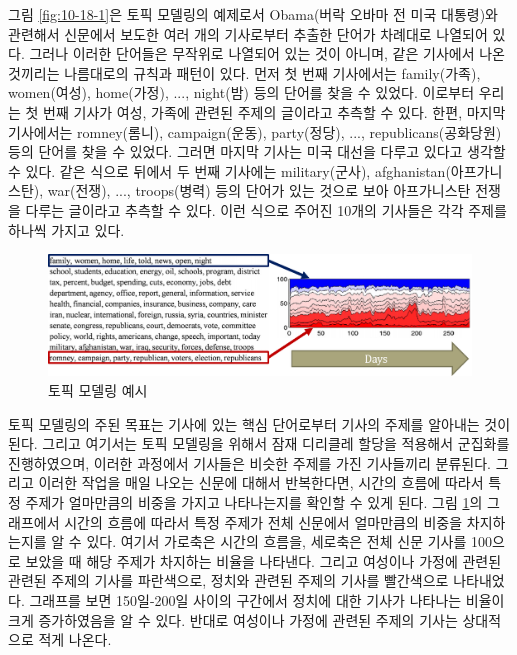 \documentclass[a4paper]{oblivoir}
\begin{document}
그림 \ref{fig:10-18-1}은 토픽 모델링의 예제로서 Obama(버락 오바마 전 미국 대통령)와 관련해서 신문에서 보도한 여러 개의 기사로부터 추출한 단어가 차례대로 나열되어 있다. 그러나 이러한 단어들은 무작위로 나열되어 있는 것이 아니며, 같은 기사에서 나온 것끼리는 나름대로의 규칙과 패턴이 있다. 먼저 첫 번째 기사에서는 family(가족), women(여성), home(가정), ..., night(밤) 등의 단어를 찾을 수 있었다. 이로부터 우리는 첫 번째 기사가 여성, 가족에 관련된 주제의 글이라고 추측할 수 있다. 한편, 마지막 기사에서는 romney(롬니), campaign(운동), party(정당), ..., republicans(공화당원) 등의 단어를 찾을 수 있었다. 그러면 마지막 기사는 미국 대선을 다루고 있다고 생각할 수 있다. 같은 식으로 뒤에서 두 번째 기사에는 military(군사), afghanistan(아프가니스탄), war(전쟁), ..., troops(병력) 등의 단어가 있는 것으로 보아 아프가니스탄 전쟁을 다루는 글이라고 추측할 수 있다. 이런 식으로 주어진 10개의 기사들은 각각 주제를 하나씩 가지고 있다. \\

\begin{figure}[ht] \centering 
\includegraphics[scale=0.5]{fig10_19.png} 
\caption{토픽 모델링 예시}
\label{fig:10-19}
\end{figure}

토픽 모델링의 주된 목표는 기사에 있는 핵심 단어로부터 기사의 주제를 알아내는 것이 된다. 그리고 여기서는 토픽 모델링을 위해서 잠재 디리클레 할당을 적용해서 군집화를 진행하였으며, 이러한 과정에서 기사들은 비슷한 주제를 가진 기사들끼리 분류된다. 그리고 이러한 작업을 매일 나오는 신문에 대해서 반복한다면, 시간의 흐름에 따라서 특정 주제가 얼마만큼의 비중을 가지고 나타나는지를 확인할 수 있게 된다. 그림 \ref{fig:10-19}의 그래프에서 시간의 흐름에 따라서 특정 주제가 전체 신문에서 얼마만큼의 비중을 차지하는지를 알 수 있다. 여기서 가로축은 시간의 흐름을, 세로축은 전체 신문 기사를 100으로 보았을 때 해당 주제가 차지하는 비율을 나타낸다. 그리고 여성이나 가정에 관련된 관련된 주제의 기사를 파란색으로, 정치와 관련된 주제의 기사를 빨간색으로 나타내었다. 그래프를 보면 150일-200일 사이의 구간에서 정치에 대한 기사가 나타나는 비율이 크게 증가하였음을 알 수 있다. 반대로 여성이나 가정에 관련된 주제의 기사는 상대적으로 적게 나온다. \\
\end{document}
